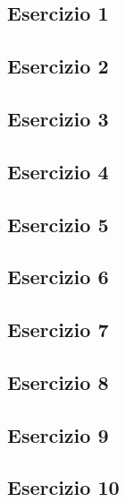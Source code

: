\documentclass[a4paper,12pt,oneside]{book}
\begin{document}
\hypertarget{esercizio-1-4}{%
\subsection{Esercizio 1}\label{esercizio-1-4}}

\hypertarget{esercizio-2-3}{%
\subsection{Esercizio 2}\label{esercizio-2-3}}

\hypertarget{esercizio-3-3}{%
\subsection{Esercizio 3}\label{esercizio-3-3}}

\hypertarget{esercizio-4-2}{%
\subsection{Esercizio 4}\label{esercizio-4-2}}

\hypertarget{esercizio-5-2}{%
\subsection{Esercizio 5}\label{esercizio-5-2}}

\hypertarget{esercizio-6-1}{%
\subsection{Esercizio 6}\label{esercizio-6-1}}

\hypertarget{esercizio-7-1}{%
\subsection{Esercizio 7}\label{esercizio-7-1}}

\hypertarget{esercizio-8-1}{%
\subsection{Esercizio 8}\label{esercizio-8-1}}

\hypertarget{esercizio-9}{%
\subsection{Esercizio 9}\label{esercizio-9}}

\hypertarget{esercizio-10}{%
\subsection{Esercizio 10}\label{esercizio-10}}
\end{document}
